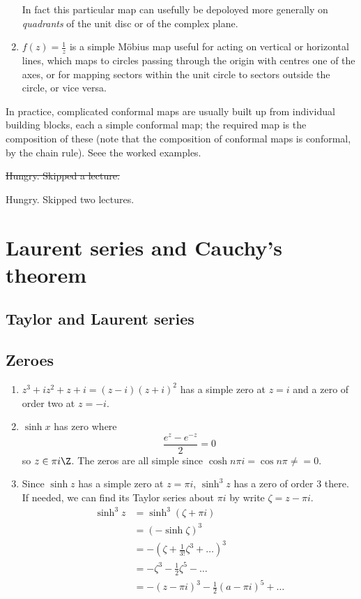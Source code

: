 \documentclass[a4paper]{article}
\begin{document}
\begin{eg}
\begin{enumerate}
    In fact this particular map can usefully be depoloyed more generally on \emph{quadrants} of the unit disc or of the complex plane.
  \item \(f(z) = \frac{1}{z}\) is a simple Möbius map useful for acting on vertical or horizontal lines, which maps to circles passing through the origin with centres one of the axes, or for mapping sectors within the unit circle to sectors outside the circle, or vice versa.
  \end{enumerate}
\end{eg}

In practice, complicated conformal maps are usually built up from individual building blocks, each a simple conformal map; the required map is the composition of these (note that the composition of conformal maps is conformal, by the chain rule). Seee the worked examples.

\sout{Hungry. Skipped a lecture.}

Hungry. Skipped two lectures.

\section{Laurent series and Cauchy's theorem}

\subsection{Taylor and Laurent series}

\subsection{Zeroes}

\begin{eg}\leavevmode
  \begin{enumerate}
  \item \(z^3 + iz^2 + z + i = (z - i)(z + i)^2\) has a simple zero at \(z = i\) and a zero of order two at \(z = -i\).
  \item \(\sinh x\) has zero where
    \[
      \frac{e^z - e^{-z}}{2} = 0
    \]
    so \(z \in \pi i\Z\). The zeros are all simple since \(\cosh n\pi i = \cos n\pi \neq = 0\).
  \item Since \(\sinh z\) has a simple zero at \(z = \pi i\), \(\sinh^3 z\) has a zero of order \(3\) there. If needed, we can find its Taylor series about \(\pi i\) by write \(\zeta = z - \pi i\).
    \begin{align*}
      \sinh^3 z
      &= \sinh^3 (\zeta + \pi i) \\
      &= (-\sinh \zeta)^3 \\
      &= -(\zeta + \frac{1}{3!}\zeta^3 + \dots) ^3 \\
      &= -\zeta^3 - \frac{1}{2}\zeta^5 - \dots \\
      &= -(z - \pi i)^3 - \frac{1}{2}(a - \pi i)^5 + \dots
    \end{align*}
  \end{enumerate}
\end{eg}
\end{document}
